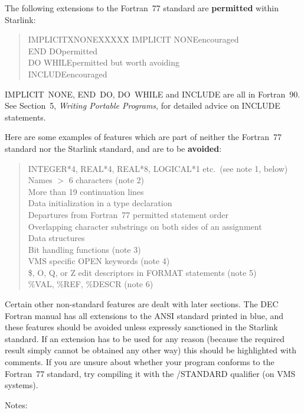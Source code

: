 \documentclass[twoside,11pt,nolof,noabs]{starlink}
\renewcommand{\_}{{\tt\char'137}}
\begin{document}
The following extensions to the Fortran~77 standard are \textbf{permitted}
within Starlink:
\begin{quote}
\begin{tabbing}
IMPLICITXNONEXXXXX\=\kill
IMPLICIT NONE\>encouraged\\
END DO\>permitted\\
DO WHILE\>permitted but worth avoiding\\
INCLUDE\>encouraged
\end{tabbing}
\end{quote}
IMPLICIT~NONE, END~DO, DO~WHILE and INCLUDE are all
in Fortran~90.  See Section~5, \textit{Writing Portable
Programs}, for detailed advice on INCLUDE statements.

Here are some examples of features which are part of neither the Fortran~77
standard nor the Starlink standard, and are to be \textbf{avoided}:
\begin{quote}
INTEGER*4, REAL*4, REAL*8, LOGICAL*1 etc.\ (see note 1, below)\\
Names $>$ 6 characters (note 2)\\
More than 19 continuation lines\\
Data initialization in a type declaration\\
Departures from Fortran~77 permitted statement order\\
Overlapping character substrings on both sides of an assignment\\
Data structures\\
Bit handling functions (note 3)\\
VMS specific OPEN keywords (note 4)\\
\$, O, Q, or Z edit descriptors in FORMAT statements (note 5)\\
\%VAL, \%REF, \%DESCR (note 6)
\end{quote}
Certain other non-standard features are dealt with later sections.
The DEC Fortran manual has all extensions to the ANSI standard
printed in blue, and these features should be avoided unless
expressly sanctioned in the Starlink standard.  If an
extension has to be used for any reason (because the required
result simply cannot be obtained any other way) this should
be highlighted with comments.  If you are unsure about whether
your program conforms to the Fortran~77 standard, try compiling
it with the /STANDARD qualifier (on VMS systems).

Notes:
\end{document}
